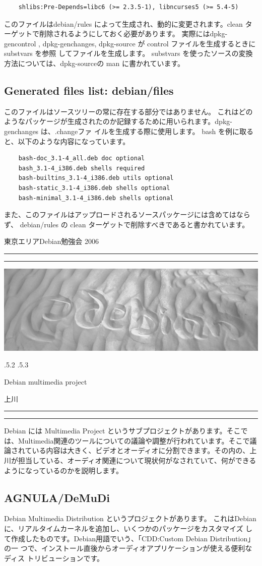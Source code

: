 \documentclass[mingoth,a4paper]{jsarticle}
\makeatletter
\renewcommand{\section}{\@startsection{section}{1}{\z@}%
    {\Cvs \@plus.5\Cdp \@minus.2\Cdp}%
    {.5\Cvs \@plus.3\Cdp}%
    {\normalfont\Huge\headfont\raggedright\centering}} %
\newcommand{\dancersection}[2]{%
\newpage
東京エリアDebian勉強会 2006
\hrule
\vspace{0.5mm}
\hrule
\hfill{}\includegraphics[width=16cm]{image2006-natsu/guruguru-sand-light.png}\\
\vspace{-5cm}
\begin{center}
\section{#1}
\end{center}
\hfill{}\colorbox{white}{#2}\hspace{3cm}\space\\
\vspace{1cm}
\hrule
\vspace{0.5mm}
\hrule
\vspace{1cm}
}
\makeatother
\begin{document}
\begin{verbatim}
	shlibs:Pre-Depends=libc6 (>= 2.3.5-1), libncurses5 (>= 5.4-5)
\end{verbatim}
	
	このファイルはdebian/rules によって生成され、動的に変更されます。clean ターゲットで削除されるようにしておく必要があります。
	実際にはdpkg-gencontrol , dpkg-genchanges, dpkg-source が control ファイルを生成するときに substvars を参照
	してファイルを生成します。
	substvars を使ったソースの変換方法については、dpkg-sourceの man に書かれています。
	
\subsection{Generated files list: debian/files}
	このファイルはソースツリーの常に存在する部分ではありません。
	これはどのようなパッケージが生成されたのか記録するために用いられます。dpkg-genchanges は、.changeファ
	イルを生成する際に使用します。
	bash を例に取ると、以下のような内容になっています。

\begin{verbatim}
	bash-doc_3.1-4_all.deb doc optional
	bash_3.1-4_i386.deb shells required
	bash-builtins_3.1-4_i386.deb utils optional
	bash-static_3.1-4_i386.deb shells optional
	bash-minimal_3.1-4_i386.deb shells optional
\end{verbatim}

	また、このファイルはアップロードされるソースパッケージには含めてはならず、
	debian/rules の clean ターゲットで削除すべきであると書かれています。

\dancersection{Debian multimedia project}{上川}
\label{sec:uekawa}

Debian には Multimedia Project というサブプロジェクトがあります。そこで
は、Multimedia関連のツールについての議論や調整が行われています。そこで議
論されている内容は大きく、ビデオとオーディオに分割できます。その内の、上
川が担当している、オーディオ関連について現状何がなされていて、何ができる
ようになっているのかを説明します。

\subsection{AGNULA/DeMuDi}

Debian Multimedia Distribution というプロジェクトがあります。
これはDebian に、リアルタイムカーネルを追加し、いくつかのパッケージをカスタマイズ
して作成したものです。Debian用語でいう、「CDD:Custom Debian Distribution」の一
つで、インストール直後からオーディオアプリケーションが使える便利なディス
トリビューションです。
\end{document}
